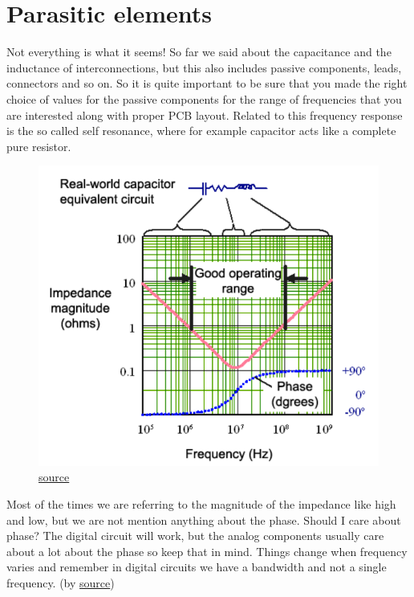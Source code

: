 \documentclass[12pt]{article}
\begin{document}
\section{Parasitic elements}

Not everything is what it seems! So far we said about the capacitance and the inductance of interconnections, but this also includes passive components, leads, connectors and so on. So it is quite important to be sure that you made the right choice of values for the passive components for the range of frequencies that you are interested along with proper PCB layout. Related to this frequency response is the so called self resonance, where for example capacitor acts like a complete pure resistor.

\begin{figure}[h!]
	\centering
	\includegraphics[keepaspectratio, height=.4\textheight, width = \textwidth]{assets/real_cap.png}
	\caption{\href{http://www.sigcon.com/Pubs/straight/resonance.htm}{source}}
\end{figure}

Most of the times we are referring to the magnitude of the impedance like high and low, but we are not mention anything about the phase. Should I care about phase? The digital circuit will work, but the analog components usually care about a lot about the phase so keep that in mind. Things change when frequency varies and remember in digital circuits we have a bandwidth and not a single frequency. (by \href{http://www.sigcon.com/Pubs/straight/resonance.htm}{source})
\end{document}
